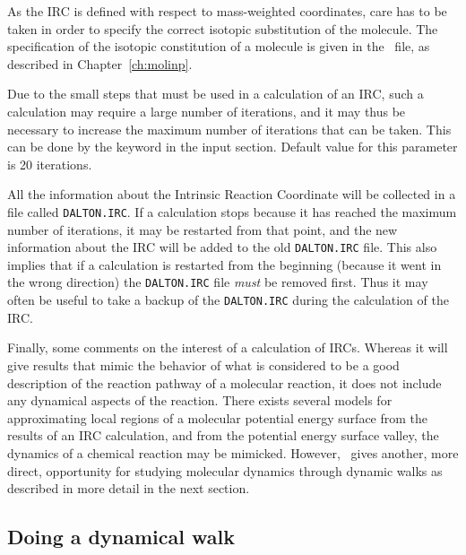 As the IRC is defined with respect to mass-weighted
coordinates, care
has to be taken in order to specify the correct isotopic substitution
of the molecule. The specification of the isotopic constitution of a
molecule is given in the \molinp\ file, as described in
Chapter~\ref{ch:molinp}. 

Due to the small steps that must be used in a calculation of an IRC,
such a calculation may require a large number of
iterations, and it
may thus be necessary to increase the maximum number of iterations
that can be taken.  This can be done by
the keyword  in the  input
section. Default value for this parameter is 20 iterations.

All the information about the Intrinsic Reaction Coordinate will be
collected in a file called \texttt{DALTON.IRC}. If a
calculation stops
because it has reached the maximum number of iterations, it may be
restarted from that point, and the new information about the IRC will
be added to the old \texttt{DALTON.IRC} file. This also implies that if a
calculation is restarted from the beginning (because it went in the
wrong direction) the \texttt{DALTON.IRC} file {\em must\/} be removed
first. Thus it may often be useful to take a backup of the
\texttt{DALTON.IRC} during the calculation of the IRC.

Finally, some comments on the interest of a calculation of IRCs.
Whereas it will give results that mimic the behavior of what is
considered to be a good description of the reaction
pathway of a
molecular reaction, it does not include any dynamical aspects of the
reaction. There exists several models for approximating local regions of a
molecular potential energy surface from the results of an IRC
calculation, and from the
potential energy surface valley, the dynamics of a
chemical reaction may be
mimicked. However, \dalton\ gives another, more direct, opportunity
for studying molecular dynamics through dynamic walks as described in
more detail in the next section.

\subsection{Doing a dynamical walk}\label{sec:dynamic}

\begin{center}
\end{center}

